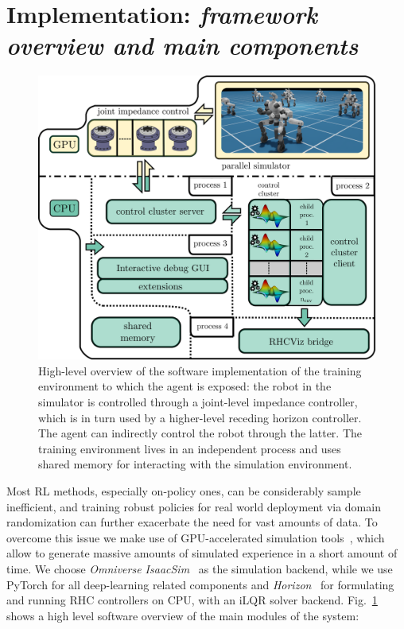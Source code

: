 \section{Implementation: \textnormal{\textit{framework overview and main components}}}
\begin{figure}[t]
	\centering
	\includegraphics[width=0.85\columnwidth]{imgs/cocluster_arch.pdf}
	\caption{High-level overview of the software implementation of the training environment to which the agent is exposed: the robot in the simulator is controlled through a joint-level impedance controller, which is in turn used by a higher-level receding horizon controller. The agent can indirectly control the robot through the latter. The training environment lives in an independent process and uses shared memory for interacting with the simulation environment.}
	\label{fig:coclbridge_arch}
	\vspace{-0.3cm}
\end{figure}
Most RL methods, especially on-policy ones, can be considerably sample inefficient, and training robust policies for real world deployment via domain randomization can further exacerbate the need for vast amounts of data. To overcome this issue we make use of GPU-accelerated simulation tools~\cite{web::isaacsim,rl:mujocoaccelereted2023}, which allow to generate massive amounts of simulated experience in a short amount of time. We choose \textit{Omniverse IsaacSim}~\cite{web::isaacsim} as the simulation backend, while we use PyTorch for all deep-learning related components and  \textit{Horizon}~\cite{frameworks::horizon_to} for formulating and running RHC controllers on CPU, with an iLQR solver backend.
Fig.~\ref{fig:coclbridge_arch} shows a high level software overview of the main modules of the system:
